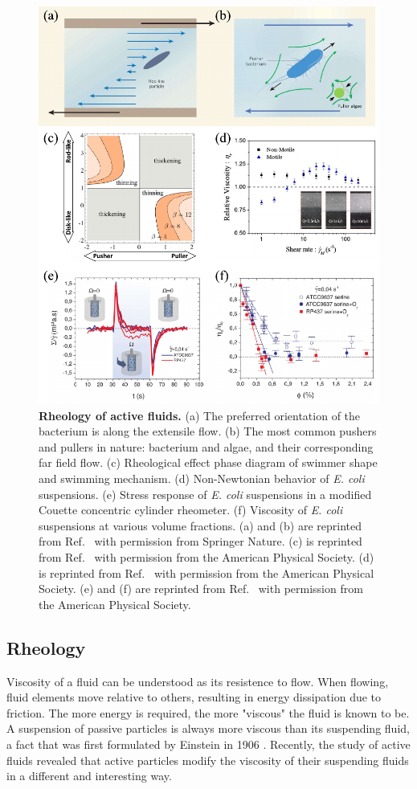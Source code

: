 \begin{figure}[!htbp]
	\begin{center}
	\includegraphics[height=4.5 in]{Figs/1-Intro/2.pdf}
	\end{center}
	\caption[Rheology of active fluids]
	{
	\textbf{Rheology of active fluids.}
	(a) The preferred orientation of the bacterium is along the extensile flow.
	(b) The most common pushers and pullers in nature: bacterium and algae, and their corresponding far field flow.
	(c) Rheological effect phase diagram of swimmer shape and swimming mechanism.
	(d) Non-Newtonian behavior of \textit{E. coli} suspensions.
	(e) Stress response of \textit{E. coli} suspensions in a modified Couette concentric cylinder rheometer.
	(f) Viscosity of \textit{E. coli} suspensions at various volume fractions.
	(a) and (b) are reprinted from Ref.~\cite{Marchetti2015} with permission from Springer Nature.
	(c) is reprinted from Ref.~\cite{Giomi2010} with permission from the American Physical Society.
	(d) is reprinted from Ref.~\cite{Gachelin2013} with permission from the American Physical Society.
	(e) and (f) are reprinted from Ref.~\cite{Lopez2015} with permission from the American Physical Society.
	}
	\label{fig:rheology-of-active-fluids}
\end{figure}

\subsection{Rheology}
\label{sec:rheology}
Viscosity of a fluid can be understood as its resistence to flow. When flowing, fluid elements move relative to others, resulting in energy dissipation due to friction. The more energy is required, the more "viscous" the fluid is known to be. A suspension
of passive particles is always more viscous than its suspending fluid, a fact that was first formulated by Einstein in 1906 \cite{Einstein1906}. Recently, the study of active fluids revealed that active particles modify the viscosity of their suspending fluids in a different and interesting way.

